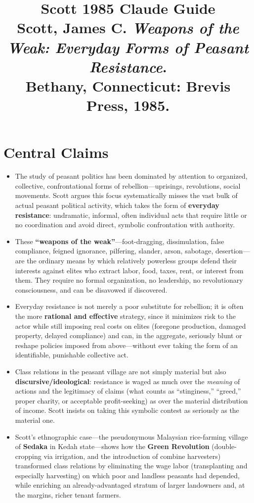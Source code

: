\documentclass[12pt]{article}
\title{\textbf{Scott 1985 Claude Guide}\\
\large Scott, James C. \textit{Weapons of the Weak: Everyday Forms of Peasant Resistance}.\\
Bethany, Connecticut: Brevis Press, 1985.}
\author{}
\date{}
\begin{document}
\maketitle
\tableofcontents
\newpage

\section{Central Claims}

\begin{itemize}[leftmargin=*, itemsep=4pt]
    \item The study of peasant politics has been dominated by attention to organized, collective, confrontational forms of rebellion---uprisings, revolutions, social movements. Scott argues this focus systematically misses the vast bulk of actual peasant political activity, which takes the form of \textbf{everyday resistance}: undramatic, informal, often individual acts that require little or no coordination and avoid direct, symbolic confrontation with authority.
    \item These \textbf{``weapons of the weak''}---foot-dragging, dissimulation, false compliance, feigned ignorance, pilfering, slander, arson, sabotage, desertion---are the ordinary means by which relatively powerless groups defend their interests against elites who extract labor, food, taxes, rent, or interest from them. They require no formal organization, no leadership, no revolutionary consciousness, and can be disavowed if discovered.
    \item Everyday resistance is not merely a poor substitute for rebellion; it is often the more \textbf{rational and effective} strategy, since it minimizes risk to the actor while still imposing real costs on elites (foregone production, damaged property, delayed compliance) and can, in the aggregate, seriously blunt or reshape policies imposed from above---without ever taking the form of an identifiable, punishable collective act.
    \item Class relations in the peasant village are not simply material but also \textbf{discursive/ideological}: resistance is waged as much over the \emph{meaning} of actions and the legitimacy of claims (what counts as ``stinginess,'' ``greed,'' proper charity, or acceptable profit-seeking) as over the material distribution of income. Scott insists on taking this symbolic contest as seriously as the material one.
    \item Scott's ethnographic case---the pseudonymous Malaysian rice-farming village of \textbf{Sedaka} in Kedah state---shows how the \textbf{Green Revolution} (double-cropping via irrigation, and the introduction of combine harvesters) transformed class relations by eliminating the wage labor (transplanting and especially harvesting) on which poor and landless peasants had depended, while enriching an already-advantaged stratum of larger landowners and, at the margins, richer tenant farmers.

\end{itemize}
\end{document}
